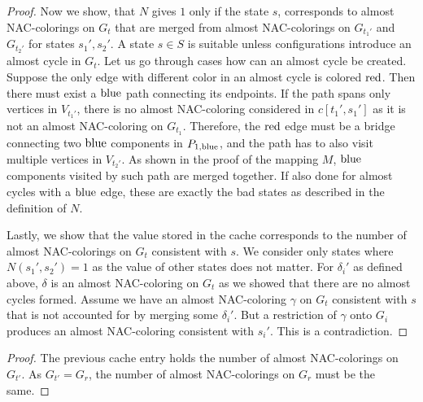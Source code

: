 \begin{proof}
	Now we show, that \( N \) gives \( 1 \) only if the state \( s \),
	corresponds to almost NAC-colorings on \( G_t \)
	that are merged from almost NAC-colorings on \( G_{t_1'} \) and \( G_{t_2'} \)
	for states \( s_1', s_2' \).
	A state \( s \in S \) is suitable unless configurations
	introduce an almost cycle in \( G_t \).
	Let us go through cases how can an almost cycle be created.
	Suppose the only edge with different color in an almost cycle is colored \( \text{red} \).
	Then there must exist a \( \text{blue} \) path connecting its endpoints.
	If the path spans only vertices
	in \( V_{t_1'} \), there is no almost NAC-coloring considered in \( c[t_1', s_1'] \)
	as it is not an almost NAC-coloring on \( G_{t_1} \).
	Therefore, the \( \text{red} \) edge must be
	a bridge connecting two \( \text{blue} \) components in \( P_{1,\text{blue}} \),
	and the path has to also visit multiple vertices in \( V_{t_2'} \).
	As shown in the proof of the mapping \( M \), \( \text{blue} \) components
	visited by such path are merged together.
	If also done for almost cycles with a \( \text{blue} \) edge,
	these are exactly the bad states as described in the definition of \( N \).

	Lastly, we show that the value stored in the cache corresponds
	to the number of almost NAC-colorings on \( G_t \) consistent with \( s \).
	We consider only states where \( N(s_1', s_2') = 1 \)
	as the value of other states does not matter.
	For \( \delta_i' \) as defined above, \( \delta \) is an almost NAC-coloring
	on \( G_t \) as we showed that there are no almost cycles formed.
	Assume we have an almost NAC-coloring \( \gamma \) on \( G_t \) consistent with \( s \)
	that is not accounted for by merging some \( \delta_i' \).
	But a restriction of \( \gamma \) onto \( G_i \) produces an almost NAC-coloring
	consistent with \( s_i' \). This is a contradiction.
\end{proof}
%

%
%
\begin{proof}
	The previous cache entry holds the number of almost NAC-colorings on \( G_{t'} \).
	As \( G_{t'} = G_r \), the number of almost NAC-colorings on \( G_r \) must be the same.
\end{proof}
%

